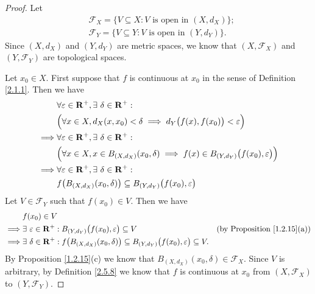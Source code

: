 \begin{proof}
    Let
    \begin{align*}
         & \mathcal{F}_X = \{V \subseteq X : V \text{ is open in } (X, d_X)\}; \\
         & \mathcal{F}_Y = \{V \subseteq Y : V \text{ is open in } (Y, d_Y)\}.
    \end{align*}
    Since \((X, d_X)\) and \((Y, d_Y)\) are metric spaces, we know that \((X, \mathcal{F}_X)\) and \((Y, \mathcal{F}_Y)\) are topological spaces.

    Let \(x_0 \in X\).
    First suppose that \(f\) is continuous at \(x_0\) in the sense of Definition \ref{2.1.1}.
    Then we have
    \begin{align*}
                 & \forall \varepsilon \in \mathbf{R}^+, \exists\ \delta \in \mathbf{R}^+ :                                                               \\
                 & \Big(\forall x \in X, d_X(x, x_0) < \delta \implies d_Y\big(f(x), f(x_0)\big) < \varepsilon\Big)                       \\
        \implies & \forall \varepsilon \in \mathbf{R}^+, \exists\ \delta \in \mathbf{R}^+ :                                                               \\
                 & \Big(\forall x \in X, x \in B_{(X, d_X)}(x_0, \delta) \implies f(x) \in B_{(Y, d_Y)}\big(f(x_0), \varepsilon\big)\Big) \\
        \implies & \forall \varepsilon \in \mathbf{R}^+, \exists\ \delta \in \mathbf{R}^+ :                                                               \\
                 & f\big(B_{(X, d_X)}(x_0, \delta)\big) \subseteq B_{(Y, d_Y)}\big(f(x_0), \varepsilon\big)
    \end{align*}
    Let \(V \in \mathcal{F}_Y\) such that \(f(x_0) \in V\).
    Then we have
    \begin{align*}
                 & f(x_0) \in V                                                                                                                                                               \\
        \implies & \exists\ \varepsilon \in \mathbf{R}^+ : B_{(Y, d_Y)}\big(f(x_0), \varepsilon\big) \subseteq V                                            & \text{(by Proposition \ref{1.2.15}(a))} \\
        \implies & \exists\ \delta \in \mathbf{R}^+ : f\big(B_{(X, d_X)}(x_0, \delta)\big) \subseteq B_{(Y, d_Y)}\big(f(x_0), \varepsilon\big) \subseteq V.
    \end{align*}
    By Proposition \ref{1.2.15}(c) we know that \(B_{(X, d_X)}(x_0, \delta) \in \mathcal{F}_X\).
    Since \(V\) is arbitrary, by Definition \ref{2.5.8} we know that \(f\) is continuous at \(x_0\) from \((X, \mathcal{F}_X)\) to \((Y, \mathcal{F}_Y)\).


\end{proof}
